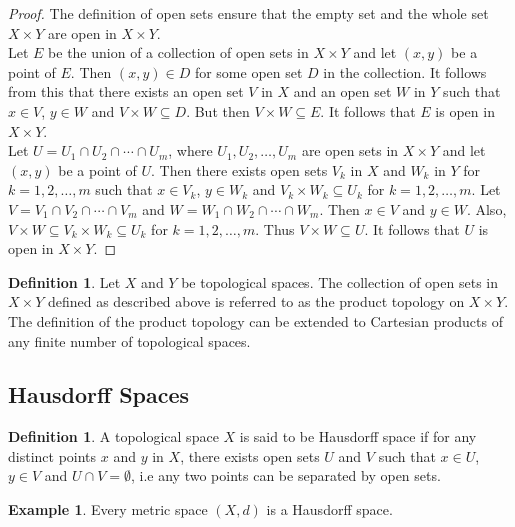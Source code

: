 \documentclass[11pt,a4paper]{article}
\theoremstyle{definition}
\newtheorem{defn}[thm]{Definition}
\newtheorem{exa}[thm]{Example}
\begin{document}
\begin{proof}
The definition of open sets ensure that the empty set and the whole set $X\times Y$ are open in $X\times Y$.\\ 
Let $E$ be the union of a collection of open sets in $X\times Y$ and let $(x,y)$ be a point of $E$. Then $(x,y)\in D$ for some open set $D$ in the collection. It follows from this that there exists an open set $V$ in $X$ and an open set $W$ in $Y$ such that $x\in V$, $y\in W$ and $V\times W\subseteq D$. But then $V\times W\subseteq E$. It follows that $E$ is open in $X\times Y$.\\ 
Let $U=U_1\cap U_2\cap\cdots\cap U_m$, where $U_1,U_2,\ldots,U_m$ are open sets in $X\times Y$ and let $(x,y)$ be a point of $U$. Then there exists open sets $V_k$ in $X$ and $W_k$ in $Y$ for $k=1,2,\ldots,m$ such that $x\in V_k$, $y\in W_k$ and $V_k\times W_k\subseteq U_k$ for $k=1,2,\ldots,m$. Let $V=V_1\cap V_2\cap\cdots\cap V_m$ and $W=W_1\cap W_2\cap\cdots\cap W_m$. Then $x\in V$ and $y\in W$. Also, $V\times W\subseteq V_k\times W_k\subseteq U_k$ for $k=1,2,\ldots,m$. Thus $V\times W\subseteq U$. It follows that $U$ is open in $X\times Y$.
\end{proof}

\begin{defn}
Let $X$ and $Y$ be topological spaces. The collection of open sets in $X\times Y$ defined as described above is referred to as the product topology on $X\times Y$. The definition of the product topology can be extended to Cartesian products of any finite number of topological spaces.
\end{defn}








\subsection{Hausdorff Spaces}

\begin{defn}
A topological space $X$ is said to be Hausdorff space if for any distinct points $x$ and $y$ in $X$, there exists open sets $U$ and $V$ such that $x\in U$, $y\in V$ and $U\cap V=\emptyset$,
i.e any two points can be separated by open sets.
\end{defn}




\begin{exa}
Every metric space $(X,d)$ is a Hausdorff space.
\end{exa}
\end{document}
